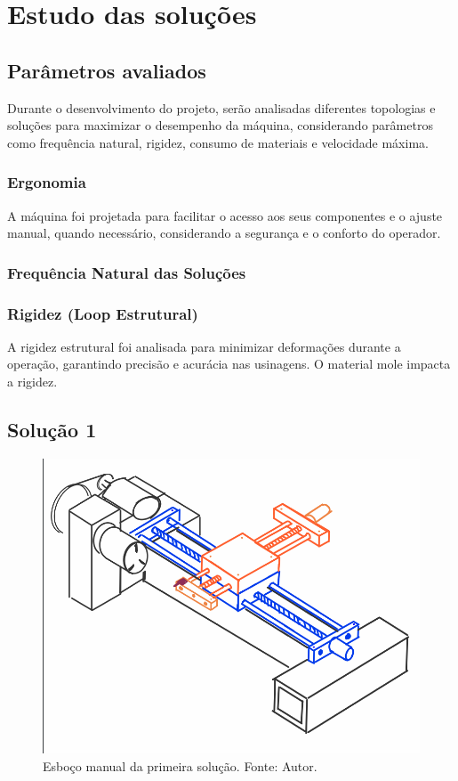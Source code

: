 \chapter{Estudo das soluções}

\section{Parâmetros avaliados}
Durante o desenvolvimento do projeto, serão analisadas diferentes topologias e soluções para maximizar o desempenho da máquina, considerando parâmetros como frequência natural, rigidez, consumo de materiais e velocidade máxima.

\subsection{Ergonomia}
A máquina foi projetada para facilitar o acesso aos seus componentes e o ajuste manual, quando necessário, considerando a segurança e o conforto do operador.


\subsection{Frequência Natural das Soluções}


\subsection{Rigidez (Loop Estrutural)}
A rigidez estrutural foi analisada para minimizar deformações durante a operação, garantindo precisão e acurácia nas usinagens. O material mole impacta a rigidez.



\section{Solução 1}
\begin{figure}[h!]
    \centering
    \includegraphics[width=0.7\linewidth]{images/sol1.png}
    \caption{Esboço manual da primeira solução. Fonte: Autor.}
    \label{fig:enter-label}
\end{figure}

